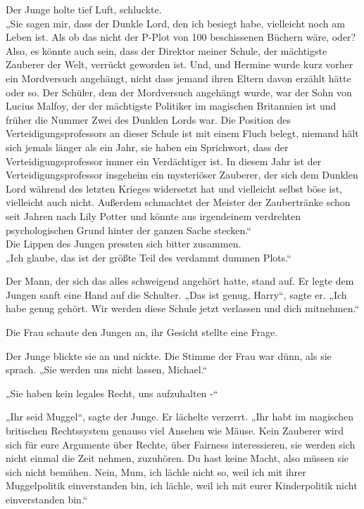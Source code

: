 {Der Junge holte tief Luft, schluckte.\\ „Sie sagen mir, dass der Dunkle Lord, den ich besiegt habe, vielleicht noch am Leben ist. Als ob das nicht der P-Plot von 100 beschissenen Büchern wäre, oder? Also, es könnte auch sein, dass der Direktor meiner Schule, der mächtigste Zauberer der Welt, verrückt geworden ist. Und, und Hermine wurde kurz vorher ein Mordversuch angehängt, nicht dass jemand ihren Eltern davon erzählt hätte oder so. Der Schüler, dem der Mordversuch angehängt wurde, war der Sohn von Lucius Malfoy, der der mächtigste Politiker im magischen Britannien ist und früher die Nummer Zwei des Dunklen Lords war. Die Position des Verteidigungsprofessors an dieser Schule ist mit einem Fluch belegt, niemand hält sich jemals länger als ein Jahr, sie haben ein Sprichwort, dass der Verteidigungsprofessor immer ein Verdächtiger ist. In diesem Jahr ist der Verteidigungsprofessor insgeheim ein mysteriöser Zauberer, der sich dem Dunklen Lord während des letzten Krieges widersetzt hat und vielleicht selbst böse ist, vielleicht auch nicht. Außerdem schmachtet der Meister der Zaubertränke schon seit Jahren nach Lily Potter und könnte aus irgendeinem verdrehten psychologischen Grund hinter der ganzen Sache stecken.“\\ Die Lippen des Jungen pressten sich bitter zusammen.\\ „Ich glaube, das ist der größte Teil des verdammt dummen Plots.“

Der Mann, der sich das alles schweigend angehört hatte, stand auf. Er legte dem Jungen sanft eine Hand auf die Schulter. „Das ist genug, Harry“, sagte er. „Ich habe genug gehört. Wir werden diese Schule jetzt verlassen und dich mitnehmen.“

Die Frau schaute den Jungen an, ihr Gesicht stellte eine Frage.

Der Junge blickte sie an und nickte. Die Stimme der Frau war dünn, als sie sprach. „Sie werden uns nicht lassen, Michael.“

„Sie haben kein legales Recht, uns aufzuhalten -“

„Ihr seid Muggel“, sagte der Junge. Er lächelte verzerrt. „Ihr habt im magischen britischen Rechtssystem genauso viel Ansehen wie Mäuse. Kein Zauberer wird sich für eure Argumente über Rechte, über Fairness interessieren, sie werden sich nicht einmal die Zeit nehmen, zuzuhören. Du hast keine Macht, also müssen sie sich nicht bemühen. Nein, Mum, ich lächle nicht so, weil ich mit ihrer Muggelpolitik einverstanden bin, ich lächle, weil ich mit eurer Kinderpolitik nicht einverstanden bin.“

}
